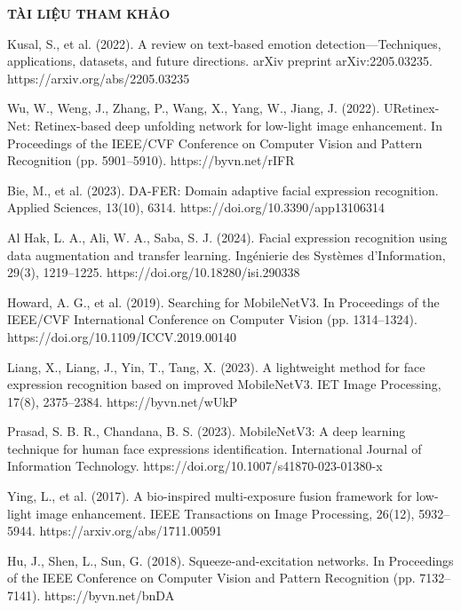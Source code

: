 {\LARGE \textbf{TÀI LIỆU THAM KHẢO}} \\[1cm] %

\begin{enumerate}[label={[{\arabic*}]}]
    \item Kusal, S., et al. (2022). A review on text-based emotion detection—Techniques, applications, datasets, and future directions. arXiv preprint arXiv:2205.03235. https://arxiv.org/abs/2205.03235

    \item Wu, W., Weng, J., Zhang, P., Wang, X., Yang, W., Jiang, J. (2022). URetinex-Net: Retinex-based deep unfolding network for low-light image enhancement. In Proceedings of the IEEE/CVF Conference on Computer Vision and Pattern Recognition (pp. 5901–5910). https://byvn.net/rIFR

    \item Bie, M., et al. (2023). DA-FER: Domain adaptive facial expression recognition. Applied Sciences, 13(10), 6314. https://doi.org/10.3390/app13106314

    \item Al Hak, L. A., Ali, W. A., Saba, S. J. (2024). Facial expression recognition using data augmentation and transfer learning. Ingénierie des Systèmes d'Information, 29(3), 1219–1225. https://doi.org/10.18280/isi.290338

    \item Howard, A. G., et al. (2019). Searching for MobileNetV3. In Proceedings of the IEEE/CVF International Conference on Computer Vision (pp. 1314–1324). https://doi.org/10.1109/ICCV.2019.00140

    \item Liang, X., Liang, J., Yin, T., Tang, X. (2023). A lightweight method for face expression recognition based on improved MobileNetV3. IET Image Processing, 17(8), 2375–2384. https://byvn.net/wUkP

    \item Prasad, S. B. R., Chandana, B. S. (2023). MobileNetV3: A deep learning technique for human face expressions identification. International Journal of Information Technology. https://doi.org/10.1007/s41870-023-01380-x
    
    \item Ying, L., et al. (2017). A bio-inspired multi-exposure fusion framework for low-light image enhancement. IEEE Transactions on Image Processing, 26(12), 5932–5944. https://arxiv.org/abs/1711.00591
    
    \item Hu, J., Shen, L., Sun, G. (2018). Squeeze-and-excitation networks. In Proceedings of the IEEE Conference on Computer Vision and Pattern Recognition (pp. 7132–7141). https://byvn.net/bnDA
    
\end{enumerate}